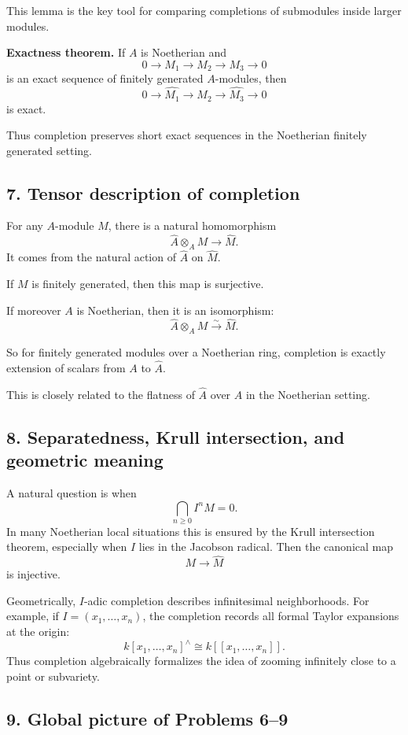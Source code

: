 \documentclass[12pt,a4paper]{article}
\theoremstyle{plain}
\theoremstyle{definition}      %
\begin{document}
This lemma is the key tool for comparing completions of submodules inside larger modules.

\medskip
\textbf{Exactness theorem.}
If \(A\) is Noetherian and
\[
0\to M_1\to M_2\to M_3\to 0
\]
is an exact sequence of finitely generated \(A\)-modules, then
\[
0\to \widehat{M_1}\to \widehat{M_2}\to \widehat{M_3}\to 0
\]
is exact.

Thus completion preserves short exact sequences in the Noetherian finitely generated setting.

\subsection*{7. Tensor description of completion}

For any \(A\)-module \(M\), there is a natural homomorphism
\[
\widehat A\otimes_A M \to \widehat M.
\]
It comes from the natural action of \(\widehat A\) on \(\widehat M\).

If \(M\) is finitely generated, then this map is surjective.

If moreover \(A\) is Noetherian, then it is an isomorphism:
\[
\widehat A\otimes_A M \xrightarrow{\sim} \widehat M.
\]

So for finitely generated modules over a Noetherian ring, completion is exactly extension of scalars from \(A\) to \(\widehat A\).

This is closely related to the flatness of \(\widehat A\) over \(A\) in the Noetherian setting.

\subsection*{8. Separatedness, Krull intersection, and geometric meaning}

A natural question is when
\[
\bigcap_{n\ge0} I^nM=0.
\]
In many Noetherian local situations this is ensured by the Krull intersection theorem, especially when \(I\) lies in the Jacobson radical. Then the canonical map
\[
M\to \widehat M
\]
is injective.

Geometrically, \(I\)-adic completion describes infinitesimal neighborhoods. For example, if \(I=(x_1,\dots,x_n)\), the completion records all formal Taylor expansions at the origin:
\[
k[x_1,\dots,x_n]^\wedge \cong k[[x_1,\dots,x_n]].
\]
Thus completion algebraically formalizes the idea of zooming infinitely close to a point or subvariety.

\subsection*{9. Global picture of Problems 6--9}
\end{document}
